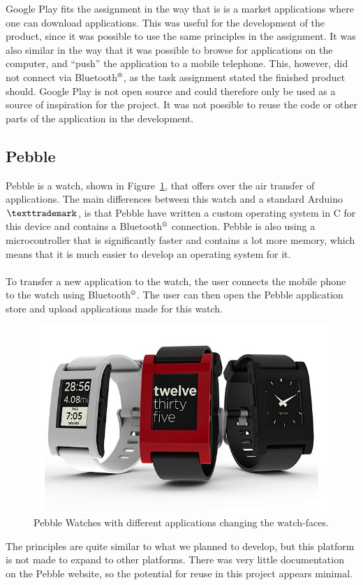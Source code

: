 Google Play fits the assignment in the way that is is a market applications where one can download applications. This was useful for the development of the product, since it was possible to use the same principles in the assignment. It was also similar in the way that it was possible to browse for applications on the computer, and ``push'' the application to a mobile telephone. This, however, did not connect via Bluetooth$\textsuperscript{\textregistered}$, as the task assignment stated the finished product should. Google Play is not open source and could therefore only be used as a source of inspiration for the project. It was not possible to reuse the code or other parts of the application in the development.



\subsection{Pebble}
\label{sec:pebblewatch}
Pebble is a watch, shown in Figure~\ref{fig:pebblewatch}, that offers over the air transfer of applications. The main differences between this watch and a standard Arduino$\texttrademark$, is that Pebble have written a custom operating system in C for this device and contains a Bluetooth$\textsuperscript{\textregistered}$ connection. Pebble is also using a microcontroller that is significantly faster and contains a lot more memory, which means that it is much easier to develop an operating system for it.\\
\\
To transfer a new application to the watch, the user connects the mobile phone to the watch using Bluetooth$\textsuperscript{\textregistered}$. The user can then open the Pebble application store and upload applications made for this watch.

\begin{figure}[H]
\includegraphics[scale=0.7]{images/Pebble-Smartphone-Watch.jpeg}
\caption[Pebble watch]{Pebble Watches with different applications changing the watch-faces.}
\label{fig:pebblewatch}
\end{figure}
The principles are quite similar to what we planned to develop, but this platform is not made to expand to other platforms. There was very little documentation on the Pebble website, so the potential for reuse in this project appears minimal.


